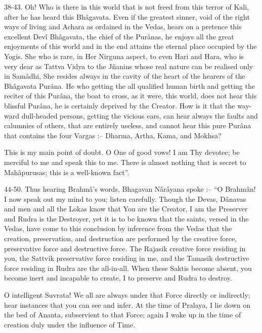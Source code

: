 38-43. Oh! Who is there in this world that is not freed from this terror of Kali, after he has heard this Bhâgavata. Even if the greatest sinner, void of the right ways of living and Achara as ordained in the Vedas, hears on a pretence this excellent Devî Bhâgavata, the chief of the Purânas, he enjoys all the great enjoyments of this world and in the end attains the eternal place occupied by the Yogis. She who is rare, in Her Nirguna aspect, to even Hari and Hara, who is very dear as Tattva Vidya to the Jñanins whose real nature can be realised only in Samâdhi, She resides always in the cavity of the heart of the hearers of the Bhâgavata Purâna. He who getting the all qualified human birth and getting the reciter of this Purâna, the boat to cross, as it were, this world, does not hear this blissful Purâna, he is certainly deprived by the Creator. How is it that the way-ward dull-headed persons, getting the vicious ears, can hear always the faults and calumnies of others, that are entirely useless, and cannot hear this pure Purâna that contains the four Vargas :-- Dharma, Artha, Kama, and Mokhsa?

 

This is my main point of doubt. O One of good vows! I am Thy devotee; be merciful to me and speak this to me. There is almost nothing that is secret to Mahâpurusas; this is a well-known fact”.

 

44-50. Thus hearing Brahmâ's words, Bhagavan Nârâyana spoke :-- “O Brahmân! I now speak out my mind to you; listen carefully. Though the Devas, Dânavas and men and all the Lokas know that You are the Creator, I am the Preserver and Rudra is the Destroyer, yet it is to be known that the saints, versed in the Vedas, have come to this conclusion by inference from the Vedas that the creation, preservation, and destruction are performed by the creative force, preservative force and destructive force. The Rajasik creative force residing in you, the  Sattvik preservative force residing in me, and the Tamasik destructive force residing in Rudra are the all-in-all. When these Saktis become absent, you become inert and incapable to create, I to preserve and Rudra to destroy.

 

O intelligent Suvrata! We all are always under that Force directly or indirectly; hear instances that you can see and infer. At the time of Pralaya, I lie down on the bed of Ananta, subservient to that Force; again I wake up in the time of creation duly under the influence of Time.

